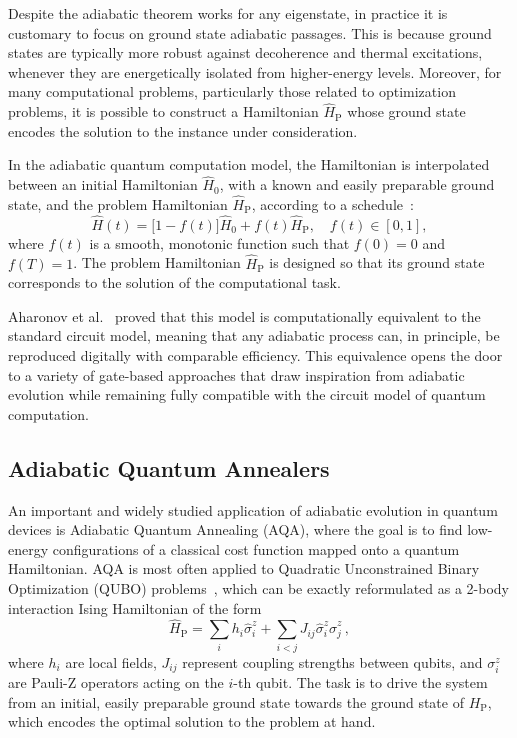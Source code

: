 Despite the adiabatic theorem works for any eigenstate, in practice it is customary to focus on ground state adiabatic passages. This is because ground states are typically more robust against decoherence and thermal excitations, whenever they are energetically isolated from higher-energy levels. Moreover, for many computational problems, particularly those related to optimization problems, it is possible to construct a Hamiltonian $\hat{H}_\mathrm{P}$ whose ground state encodes the solution to the instance under consideration.

In the adiabatic quantum computation model, the Hamiltonian is interpolated between an initial Hamiltonian $\hat{H}_0$, with a known and easily preparable ground state, and the problem Hamiltonian $\hat{H}_\mathrm{P}$, according to a schedule~\cite{albash_adiabatic_2018}:
\begin{equation}
    \hat{H}(t) = \big[1 - f(t)\big] \hat{H}_0 + f(t) \hat{H}_\mathrm{P}, \quad f(t) \in [0,1],
    \label{eq:adiabatic_passage}
\end{equation}
where $f(t)$ is a smooth, monotonic function such that $f(0)=0$ and $f(T)=1$. The problem Hamiltonian $\hat{H}_\mathrm{P}$ is designed so that its ground state corresponds to the solution of the computational task.

Aharonov et al.~\cite{aharonov_adiabatic_2004} proved that this model is computationally equivalent to the standard circuit model, meaning that any adiabatic process can, in principle, be reproduced digitally with comparable efficiency. This equivalence opens the door to a variety of gate-based approaches that draw inspiration from adiabatic evolution while remaining fully compatible with the circuit model of quantum computation.

\subsection{Adiabatic Quantum Annealers}
An important and widely studied application of adiabatic evolution in quantum devices is Adiabatic Quantum Annealing (AQA), where the goal is to find low-energy configurations of a classical cost function mapped onto a quantum Hamiltonian. AQA is most often applied to Quadratic Unconstrained Binary Optimization (QUBO) problems~\cite{kadowaki_quantum_1998}, which can be exactly reformulated as a 2-body interaction Ising Hamiltonian of the form
\begin{equation}
    \hat{H}_\mathrm{P} = \sum_i h_i \hat{\sigma}_i^z + \sum_{i<j} J_{ij} \hat{\sigma}_i^z \hat{\sigma}_j^z\,,
    \label{eq:ising_hamiltonian}
\end{equation}
where $h_i$ are local fields, $J_{ij}$ represent coupling strengths between qubits, and $\sigma_i^z$ are Pauli-Z operators acting on the $i$-th qubit. The task is to drive the system from an initial, easily preparable ground state towards the ground state of $H_\mathrm{P}$, which encodes the optimal solution to the problem at hand.

